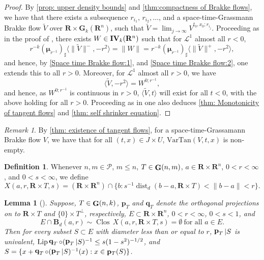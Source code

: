\documentclass{article}
\theoremstyle{plain}
\theoremstyle{definition}
\newtheorem{definition}[theorem]{Definition}
\theoremstyle{plain}
\newtheorem{lemma}[theorem]{Lemma}
\theoremstyle{remark}
\theoremstyle{remark}
\newtheorem{remark}[theorem]{Remark}
\theoremstyle{plain}
\DeclareMathOperator{\G}{{\bf G}}
\DeclareMathOperator{\IVar}{{\bf IV}}
\DeclareMathOperator{\dist}{dist}
\DeclareMathOperator{\Lip}{Lip}
\DeclareMathOperator*{\Clos}{Clos}
\DeclareMathOperator{\bfp}{{\bf p}}
\DeclareMathOperator{\bfq}{{\bf q}}
\begin{document}
\begin{proof}
By \ref{prop: upper density bounds} and \ref{thm:compactness of Brakke flows}, we have that there exists a subsequence $r_{i_{1}}, \, r_{i_{2}}, \ldots$, and a space-time-Grassmann Brakke flow $\tilde{V}$ over $\mathbf{R} \times \mathbf{G}_{k} (\mathbf{R}^{n})$, such that $\tilde{V} = \lim_{j \rightarrow \infty} V^{t_{0}, x_{0}; r_{i_{j}}}$. 
Proceeding as in the proof of \cite[3.8]{tonegawa2019brakke}, 
there exists $W\in \IVar_k(\mathbf R^n)$ such that for $\mathscr{L}^{1}$ almost all $r < 0$,
\begin{equation*}
    r^{-k} (\boldsymbol{\mu}_{r^{-1}})_{\sharp}\langle \| \tilde{V} \|^{-}, -r^{2} \rangle= \| W\| = r^{-k}(\boldsymbol{\mu}_{r^{-1}})_{\sharp} \langle \| \tilde{V} \|^{+}, - r^{2} \rangle,
\end{equation*}
and hence, by \ref{Space time Brakke flow:1}, and \ref{Space time Brakke flow:2}, one extends this to all $r > 0$.
Moreover, for $\mathscr{L}^{1}$ almost all $r > 0$, 
we have
\begin{equation*}
    \langle \tilde{V}, - r^{2} \rangle = W^{0; r^{-1}},
\end{equation*}
and hence, as $W^{0; r^{-1}}$ is continuous in $r > 0$, $\langle \tilde{V}, t \rangle$ will exist for all $t < 0$, with the above holding for all $r > 0$.
Proceeding as in \cite[3.8]{tonegawa2019brakke} one also deduces \ref{thm: Monotonicity of tangent flows} and \ref{thm: self shrinker equation}.

\end{proof}

\begin{remark}
    By \ref{thm: existence of tangent flows}, for a space-time-Grassamann Brakke flow $V$, we have that for all $(t, x) \in J \times U$, $\mathrm{VarTan} (V, t, x)$ is non-empty. 
\end{remark}

\begin{definition}
    Whenever $n,m \in \mathscr P$, $m\leq n$, $T\in \G(n,m)$, $a\in \mathbf R \times \mathbf R^n$,
    $0<r<\infty$, and $0<s<\infty$, we define 
    \[ X(a,r,\mathbf{R} \times T,s) = (\mathbf R \times \mathbf R^n) \cap \{ b : s^{-1}\dist_{d}(b-a, \mathbf{R} \times T) < \|b-a\| <r\}.\]
\end{definition}
\begin{lemma}[]
\label{Paraoblic Lipshitz graph condition}
    Suppose, $T \in \G(n, k)$, $\mathbf p_{T}$ and $\mathbf q_{T}$ denote the orthogonal projections on to $\mathbf{R} \times T$ and $\{0\} \times T^{\perp}$, respectively,
    $E\subset \mathbf R \times \mathbf R^n$, 
    $0<r<\infty$, $0<s<1$, and  
    \[ E \cap \mathbf{B}_{d} (a, r) \sim \Clos \, X(a,r, \mathbf{R} \times T, s) = \emptyset \ \text{for all $a\in E$}.\]
    Then for every subset $S \subset E$ with diameter less than or equal to $r$, $\bfp_{T}|S$ is univalent, $\Lip \bfq_{T} \circ (\bfp_{T}|S)^{-1}\leq s (1 - s^{2})^{-1 / 2}$, and 
    $S = \{ x + \bfq_{T}\circ (\bfp_{T} |S)^{-1}(x) : x\in \mathbf{p}_{T} (S)\}$.
\end{lemma}
\end{document}
